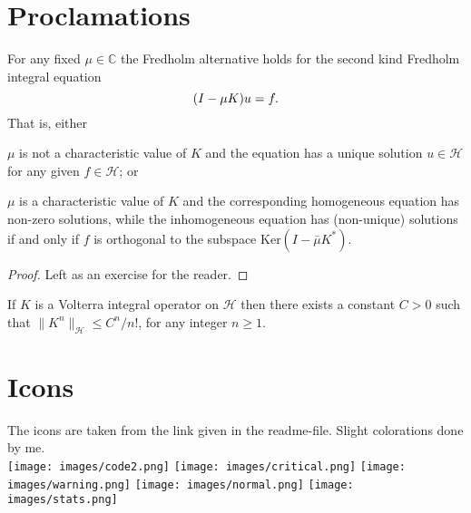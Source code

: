\documentclass{TMarticle}
\begin{document}
\section{Proclamations}

\begin{theorem}
    For any fixed $\mu \in \mathbb{C}$ the Fredholm alternative holds for the
    second kind Fredholm integral equation
    \begin{equation}
        \notag
        (I - \mu K) u = f.
    \end{equation}
    That is, either
    \begin{inparaenum}[a)]
    \item $\mu$ is not a characteristic value of $K$ and the equation has a
        unique solution $u \in \mathcal{H}$ for any given $f \in \mathcal{H}$;
        or \item $\mu$ is a characteristic value of $K$ and the corresponding
        homogeneous equation has non-zero solutions, while the inhomogeneous
        equation has (non-unique) solutions if and only if $f$ is orthogonal to
        the subspace $\mathrm{Ker}(I - \bar{\mu}K^*)$. 
    \end{inparaenum}
\end{theorem}
\begin{proof}
    Left as an exercise for the reader.
\end{proof}
\begin{lemma}
    If $K$ is a Volterra integral operator on $\mathcal{H}$ then there exists a
    constant $C > 0$ such that $\|K^n\|_{\mathcal{H}} \leq C^n / n!$, for any
    integer $n \geq 1$.
\end{lemma}

\section{Icons}
\label{sec:icons}

The icons are taken from the link given in the readme-file. Slight colorations
done by me.\\

    \texttt{[image: images/code2.png]}
    \texttt{[image: images/critical.png]}
    \texttt{[image: images/warning.png]}
    \texttt{[image: images/normal.png]}
    \texttt{[image: images/stats.png]}
\end{document}
